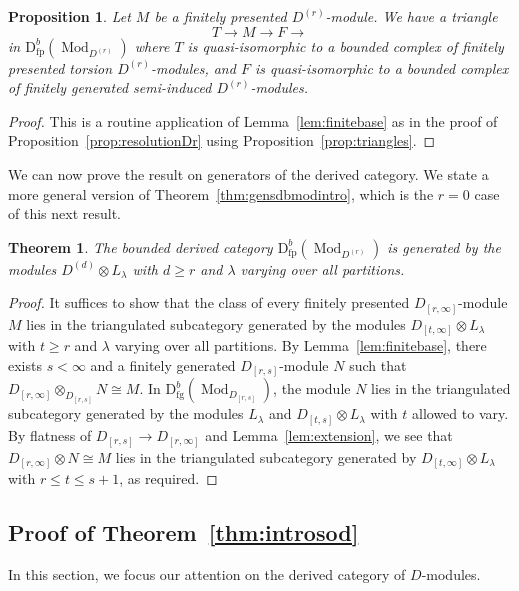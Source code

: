\documentclass[12pt]{amsart}
\newcommand{\rD}{\mathrm{D}}
\DeclareMathOperator{\Mod}{Mod}
\DeclareMathOperator{\fgen}{fg}
\DeclareMathOperator{\fpre}{fp}
\newcommand{\Dr}{D^{(r)}}
\newcommand{\Drs}{D_{[r,s]}}
\newcommand{\Drinfty}{D_{[r,\infty]}}
\numberwithin{equation}{section}
\newtheorem{theorem}[equation]{Theorem}
\newtheorem{proposition}[equation]{Proposition}
\theoremstyle{definition}
\theoremstyle{plain}
\begin{document}
\begin{proposition}\label{prop:trianglesDr}
    Let $M$ be a finitely presented $\Dr$-module. We have a triangle $$T \to M \to F \to$$ in $\rD^b_{\fpre}(\Mod_{\Dr})$ where $T$ is quasi-isomorphic to a bounded complex of finitely presented torsion $\Dr$-modules, and $F$ is quasi-isomorphic to a bounded complex of finitely generated semi-induced $\Dr$-modules. 
\end{proposition}
\begin{proof} 
This is a routine application of Lemma~\ref{lem:finitebase} as in the proof of Proposition~\ref{prop:resolutionDr} using Proposition~\ref{prop:triangles}.
\end{proof}


We can now prove the result on generators of the derived category. We state a more general version of Theorem~\ref{thm:gensdbmodintro}, which is the $r=0$ case of this next result.

\begin{theorem} \label{thm:gensdbDr}
   The bounded derived category $\rD^b_{\fpre}(\Mod_{\Dr})$ is generated by the modules $D^{(d)} \otimes L_{\lambda}$ with $d \geq r$ and $\lambda$ varying over all partitions. 
\end{theorem}
\begin{proof}
    It suffices to show that the class of every finitely presented $\Drinfty$-module $M$ lies in the triangulated subcategory generated by the modules $D_{[t, \infty]} \otimes L_{\lambda}$ with $t \geq r$ and $\lambda$ varying over all partitions. By Lemma~\ref{lem:finitebase}, there exists $s < \infty$ and a finitely generated $\Drs$-module $N$ such that $\Drinfty \otimes_{\Drs} N \cong M$. In $\rD^b_{\fgen}(\Mod_{\Drs})$, the module $N$ lies in the triangulated subcategory generated by the modules $L_{\lambda}$ and $D_{[t, s]} \otimes L_{\lambda}$ with $t$ allowed to vary. By flatness of $D_{[r, s]} \to D_{[r, \infty]}$ and Lemma~\ref{lem:extension}, we see that $\Drinfty \otimes N \cong M$ lies in the triangulated subcategory generated by $D_{[t, \infty]} \otimes L_{\lambda}$ with $r \leq t \leq s+1$, as required.
\end{proof}

\subsection{Proof of Theorem~\ref{thm:introsod}}
In this section, we focus our attention on the derived category of $D$-modules.
\end{document}
